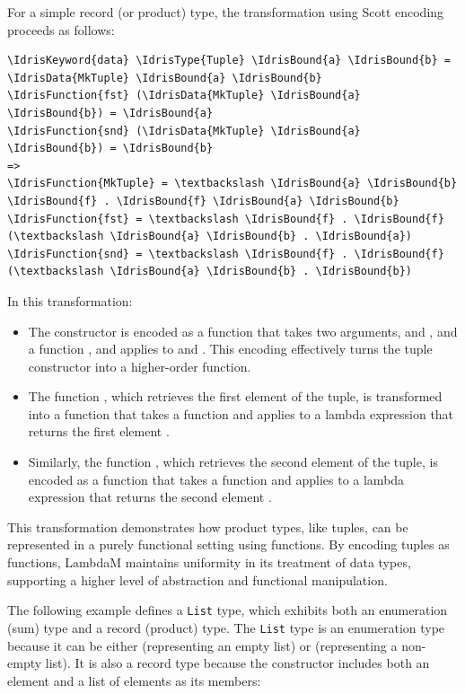 \documentclass{IEEEtran}
\begin{document}
\par For a simple record (or product) type, the transformation using Scott encoding proceeds as follows:

\begin{Verbatim}
\IdrisKeyword{data} \IdrisType{Tuple} \IdrisBound{a} \IdrisBound{b} = \IdrisData{MkTuple} \IdrisBound{a} \IdrisBound{b}
\IdrisFunction{fst} (\IdrisData{MkTuple} \IdrisBound{a} \IdrisBound{b}) = \IdrisBound{a}
\IdrisFunction{snd} (\IdrisData{MkTuple} \IdrisBound{a} \IdrisBound{b}) = \IdrisBound{b}
=>
\IdrisFunction{MkTuple} = \textbackslash \IdrisBound{a} \IdrisBound{b} \IdrisBound{f} . \IdrisBound{f} \IdrisBound{a} \IdrisBound{b}
\IdrisFunction{fst} = \textbackslash \IdrisBound{f} . \IdrisBound{f} (\textbackslash \IdrisBound{a} \IdrisBound{b} . \IdrisBound{a})
\IdrisFunction{snd} = \textbackslash \IdrisBound{f} . \IdrisBound{f} (\textbackslash \IdrisBound{a} \IdrisBound{b} . \IdrisBound{b})
\end{Verbatim}

\par In this transformation:
\begin{itemize}
    \item The constructor  is encoded as a function that takes two arguments,  and , and a function , and applies  to  and . This encoding effectively turns the tuple constructor into a higher-order function.
    \item The function , which retrieves the first element of the tuple, is transformed into a function that takes a function  and applies  to a lambda expression that returns the first element .
    \item Similarly, the function , which retrieves the second element of the tuple, is encoded as a function that takes a function  and applies  to a lambda expression that returns the second element .
\end{itemize}

\par This transformation demonstrates how product types, like tuples, can be represented in a purely functional setting using functions. By encoding tuples as functions, LambdaM maintains uniformity in its treatment of data types, supporting a higher level of abstraction and functional manipulation.

\par The following example defines a \texttt{List} type, which exhibits both an enumeration (sum) type and a record (product) type. The \texttt{List} type is an enumeration type because it can be either  (representing an empty list) or  (representing a non-empty list). It is also a record type because the  constructor includes both an element and a list of elements as its members:
\end{document}
